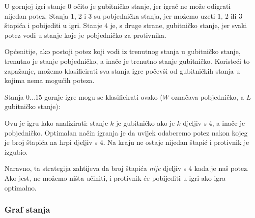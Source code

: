 U gornjoj igri stanje 0 očito je
gubitničko stanje, jer igrač ne može odigrati
nijedan potez.
Stanja 1, 2 i 3 su pobjednička stanja,
jer možemo uzeti 1, 2 ili 3 štapića
i pobijediti u igri.
Stanje 4 je, s druge strane, gubitničko stanje,
jer svaki potez vodi u stanje koje
je pobjedničko za protivnika.

Općenitije, ako postoji potez koji vodi
iz trenutnog stanja u gubitničko stanje,
trenutno je stanje pobjedničko,
a inače je trenutno stanje gubitničko.
Koristeći to zapažanje, možemo klasificirati sva stanja
igre počevši od gubitničkih stanja u kojima
nema mogućih poteza.

Stanja $0 \ldots 15$ gornje igre
mogu se klasificirati ovako
($W$ označava pobjedničko, a $L$ gubitničko stanje):
\begin{center}
\end{center}

Ovu je igru lako analizirati:
stanje $k$ je gubitničko ako je $k$
djeljiv s 4, a inače je
pobjedničko.
Optimalan način igranja je
da uvijek odaberemo potez nakon kojeg
je broj štapića na hrpi
djeljiv s 4.
Na kraju ne ostaje nijedan štapić i
protivnik je izgubio.

Naravno, ta strategija zahtijeva da
broj štapića \emph{nije} djeljiv s 4
kada je naš potez.
Ako jest, ne možemo ništa učiniti,
i protivnik će pobijediti u igri ako
igra optimalno.

\subsubsection{Graf stanja}

